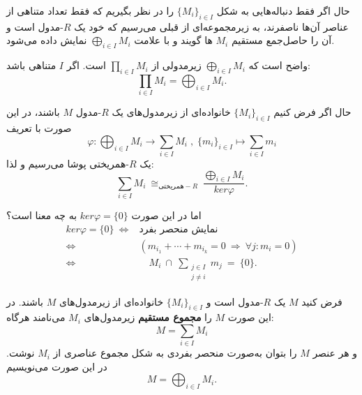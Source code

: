 \begin{frame}
    حال اگر فقط دنباله‌هایی به شکل
    $\{M_i\}_{i \in I}$
    را در نظر بگیریم که فقط تعداد متناهی از عناصر آن‌ها
    ناصفرند،
    به زیرمجموعه‌ای از قبلی می‌رسیم که خود یک
    $R$-مدول
    است و آن را
    حاصل‌جمع مستقیم
    $M_i$ ها
    گویند و با علامت
    \(\bigoplus_{i \in I} M_i\)
    نمایش داده می‌شود.

    واضح است که
    $\bigoplus_{i \in I} M_i$
    زیرمدولی از
    $\prod_{i \in I} M_i$
    است.
    اگر $I$ متناهی باشد:
    \[
        \prod_{i \in I} M_i = \bigoplus_{i \in I} M_i.
    \]

\end{frame}

\begin{frame}
    \begin{remark}
        حال اگر فرض کنیم $\{M_i\}_{i \in I}$ خانواده‌ای از زیرمدول‌های یک $R$-مدول $M$ باشند، در این صورت با تعریف
        \[
            \varphi : \bigoplus_{i \in I} M_i \longrightarrow \sum_{i \in I} M_i \; , \; \{m_i\}_{i \in I} \longmapsto \sum_{i \in I} m_i
        \]
        \[
        \]
        یک $R$-همریختی پوشا می‌رسیم و لذا:
        \[
            \sum_{i \in I} M_i \ \cong_{\text{همریختی}-R} \ \frac{\bigoplus_{i \in I} M_i}{ker \varphi}.
        \]

    \end{remark}

    اما در این صورت $ker \varphi = \{0\}$ به چه معنا است؟
    \[
        \begin{aligned}
            ker \varphi = \{0\} \ \iff & \text{نمایش  منحصر بفرد}                                                            \\
            \iff                        & \left( m_{i_1} + \cdots + m_{i_k} = 0 \ \Rightarrow \ \forall j : m_{i} = 0 \right) \\
            \iff                        & \quad M_i \ \cap \ \sum_{\substack{j \in I                                          \\ j \neq i}} m_j \ = \ \{0\}.
        \end{aligned}
    \]

\end{frame}

\begin{frame}

    \begin{theorem}
        فرض کنید $M$ یک $R$-مدول است و $\{M_i\}_{i \in I}$ خانواده‌ای از زیرمدول‌های $M$ باشند. در این صورت $M$ را \textbf{مجموع مستقیم} زیرمدول‌های $M_i$ می‌نامند هرگاه:
        \[
            M = \sum_{i \in I} M_i
        \]
        و هر عنصر $M$ را بتوان به‌صورت
        منحصر بفردی به شکل مجموع عناصری از
        \(M_i\)
        نوشت.
        در این صورت می‌نویسیم
        \[
            M = \bigoplus_{i \in I} M_i.
        \]

    \end{theorem}

\end{frame}


